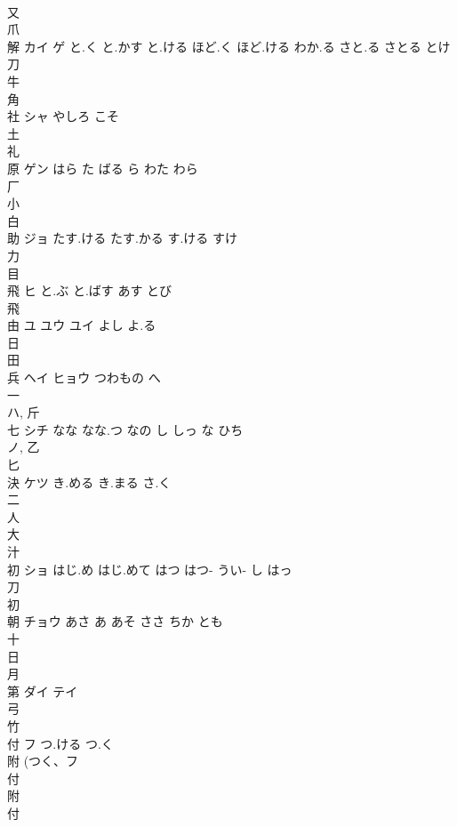 \documentclass[8pt]{extreport}
\begin{document}
\begin{CJK}{UTF8}{min}
\\	又 
\\	爪 
\\	解	カイ ゲ	と.く と.かす と.ける ほど.く ほど.ける わか.る さと.る さとる とけ	
\\	刀 
\\	牛 
\\	角 
\\	社	シャ	やしろ こそ	
\\	土 
\\	礼 
\\	原	ゲン	はら た ばる ら わた わら	
\\	厂 
\\	小 
\\	白 
\\	助	ジョ	たす.ける たす.かる す.ける すけ	
\\	力 
\\	目 
\\	飛	ヒ	と.ぶ と.ばす あす とび	
\\	飛 
\\	由	ユ ユウ ユイ	よし よ.る	
\\	日 
\\	田 
\\	兵	ヘイ ヒョウ	つわもの へ	
\\	一 
\\	ハ, 斤 
\\	七	シチ	なな なな.つ なの し しっ な ひち	
\\	ノ, 乙 
\\	匕 
\\	決	ケツ	き.める き.まる さ.く	
\\	二 
\\	人 
\\	大 
\\	汁 
\\	初	ショ	はじ.め はじ.めて はつ はつ- うい- し はっ	
\\	刀 
\\	初 
\\	朝	チョウ	あさ あ あそ ささ ちか とも	
\\	十 
\\	日 
\\	月 
\\	第	ダイ テイ		
\\	弓 
\\	竹 
\\	付	フ	つ.ける つ.く	
\\	附 (つく、フ 
\\	付 
\\	附 
\\	付 

\end{CJK}
\end{document}
